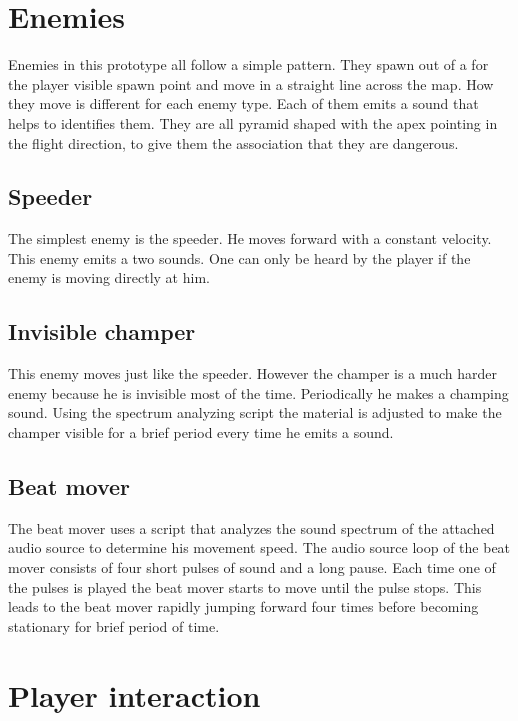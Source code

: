 \section{Enemies}
Enemies in this prototype all follow a simple pattern. They spawn out of a for the player visible spawn point and move in a straight line across the map. How they move is different for each enemy type. Each of them emits a sound that helps to identifies them. They are all pyramid shaped with the apex pointing in the flight direction, to give them the association that they are dangerous.


\subsection{Speeder}
The simplest enemy is the speeder. He moves forward with a constant velocity. This enemy emits a two sounds. One can only be heard by the player if the enemy is moving directly at him.



\subsection{Invisible champer}\label{InvisibleChamper}
This enemy moves just like the speeder. However the champer is a much harder enemy because he is invisible most of the time. Periodically he makes a champing sound. Using the spectrum analyzing script the material is adjusted to make the champer visible for a brief period every time he emits a sound.



\subsection{Beat mover}
The beat mover uses a script that analyzes the sound spectrum of the attached audio source to determine his movement speed. The audio source loop of the beat mover consists of four short pulses of sound and a long pause. Each time one of the pulses is played the beat mover starts to move until the pulse stops. This leads to the beat mover rapidly jumping forward four times before becoming stationary for brief period of time.



\section{Player interaction}
